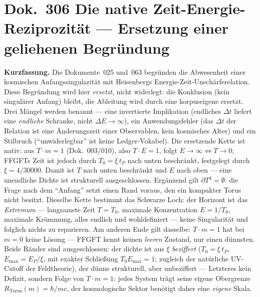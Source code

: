 
\section*{Dok.~306 \quad Die native Zeit-Energie-Reziprozität --- Ersetzung einer geliehenen Begründung}

\begingroup\small\noindent
\textbf{Kurzfassung.} Die Dokumente~025 und~063 begründen die Abwesenheit einer kosmischen
Anfangssingularität mit Heisenbergs Energie-Zeit-Unschärferelation. Diese Begründung wird hier
\emph{ersetzt}, nicht widerlegt: die Konklusion (kein singulärer Anfang) bleibt, die Ableitung
wird durch eine korpuseigene ersetzt. Drei Mängel werden benannt --- eine invertierte Implikation
(endliches $\Delta t$ liefert eine \emph{endliche} Schranke, nicht $\Delta E\to\infty$), ein
Anwendungsfehler (das $\Delta t$ der Relation ist eine Änderungszeit einer Observablen, kein
kosmisches Alter) und ein Stilbruch (\enquote{unwiderlegbar} ist keine Ledger-Vokabel). Die
ersetzende Kette ist nativ: aus $T\cdot m = 1$ (Dok.~003/010), also $T\cdot E = 1$, folgt
$E\to\infty \Leftrightarrow T\to 0$; FFGFTs Zeit ist jedoch durch $T_0 = \xi\,t_P$ nach unten beschränkt,
festgelegt durch $\xi = 4/30000$. Damit ist
$T$ nach unten beschränkt und $E$ nach oben --- eine unendliche Dichte ist strukturell
ausgeschlossen. Ergänzend gilt $\partial T^4 = \emptyset$: die Frage nach dem \enquote{Anfang}
setzt einen Rand voraus, den ein kompakter Torus nicht besitzt. Dieselbe Kette bestimmt das
Schwarze Loch: der Horizont ist das \emph{Extremum} --- langsamste Zeit $T=T_0$, maximale
Konzentration $E=1/T_0$, maximale Krümmung, alles endlich und wohldefiniert --- keine
Singularität und folglich nichts zu reparieren. Am anderen Ende gilt dasselbe: $T\cdot m = 1$ hat bei $m=0$ keine Lösung --- FFGFT kennt keinen \emph{leeren} Zustand, nur einen dünnsten. Beide Ränder sind ausgeschlossen: der dichte ist aus $\xi$ \emph{beziffert} ($T_0=\xi\,t_P$, $E_\text{max}=E_P/\xi$, mit exakter Schließung $T_0 E_\text{max}=1$; zugleich der natürliche UV-Cutoff der Feldtheorie), der dünne strukturell, aber unbeziffert --- Letzteres kein Defizit, sondern Folge von $T\cdot m=1$: jedes System trägt seine eigene Obergrenze $R_\text{Torus}(m)=\hbar/mc$, der kosmologische Sektor benötigt daher eine \emph{eigene} Skala.
\par\endgroup

